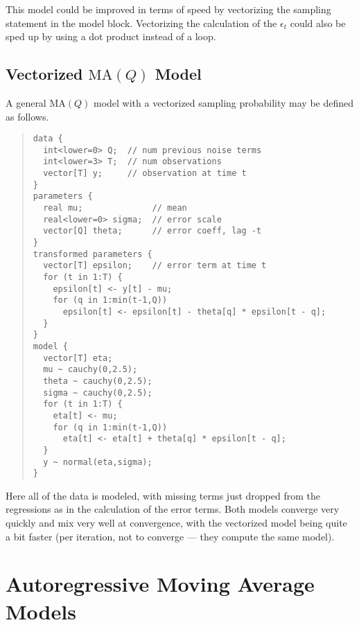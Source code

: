 This model could be improved in terms of speed by vectorizing the
sampling statement in the model block.  Vectorizing the calculation of
the $\epsilon_t$ could also be sped up by using a dot product instead
of a loop.  


\subsection{Vectorized $\mbox{MA}(Q)$ Model}

A general $\mbox{MA}(Q)$ model with a vectorized sampling probability
may be defined as follows.
%
\begin{quote}
\begin{Verbatim}[fontsize=\small]
data {
  int<lower=0> Q;  // num previous noise terms
  int<lower=3> T;  // num observations
  vector[T] y;     // observation at time t
}
parameters {
  real mu;              // mean
  real<lower=0> sigma;  // error scale
  vector[Q] theta;      // error coeff, lag -t
}
transformed parameters {
  vector[T] epsilon;    // error term at time t
  for (t in 1:T) {
    epsilon[t] <- y[t] - mu;
    for (q in 1:min(t-1,Q))
      epsilon[t] <- epsilon[t] - theta[q] * epsilon[t - q];
  }
}
model {
  vector[T] eta;
  mu ~ cauchy(0,2.5);
  theta ~ cauchy(0,2.5);
  sigma ~ cauchy(0,2.5);
  for (t in 1:T) {
    eta[t] <- mu;
    for (q in 1:min(t-1,Q))
      eta[t] <- eta[t] + theta[q] * epsilon[t - q];
  }
  y ~ normal(eta,sigma);
}
\end{Verbatim}
\end{quote}
%
Here all of the data is modeled, with missing terms just dropped from
the regressions as in the calculation of the error terms.  Both models
converge very quickly and mix very well at convergence, with the
vectorized model being quite a bit faster (per iteration, not to
converge --- they compute the same model).


\section{Autoregressive Moving Average Models}

